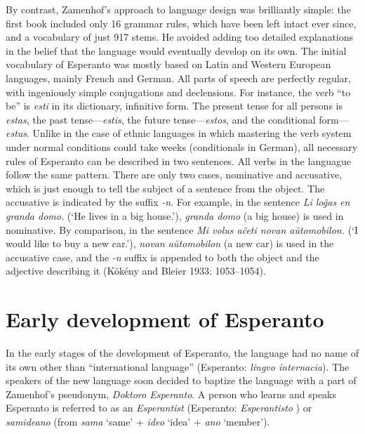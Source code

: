 By contrast, Zamenhof's approach to language design was brilliantly simple: the first book included only 16 grammar rules, which have been left intact ever since, and a vocabulary of just 917 stems.
He avoided adding too detailed explanations in the belief that the language would eventually develop on its own.
The initial vocabulary of Esperanto was mostly based on Latin and Western European languages, mainly French and German.
All parts of speech are perfectly regular, with ingeniously simple conjugations and declensions.
For instance, the verb ``to be'' is \textit{esti} in its dictionary, infinitive form.
The present tense for all persons is \textit{estas}, the past tense---\textit{estis}, the future tense---\textit{estos}, and the conditional form---\textit{estus}.
Unlike in the case of ethnic languages in which mastering the verb system under normal conditions could take weeks (conditionals in German), all necessary rules of Esperanto can be described in two sentences.
All verbs in the languague follow the same pattern.
There are only two cases, nominative and accusative, which is just enough to tell the subject of a sentence from the object.
The accusative is indicated by the suffix \textit{-n}.
For example, in the sentence \textit{Li loĝas en granda domo.} (`He lives in a big house.'), \textit{granda domo} (a big house) is used in nominative.
By comparison, in the sentence \textit{Mi volus aĉeti novan aŭtomobilon.} (`I would like to buy a new car.'), \textit{novan aŭtomobilon} (a new car) is used in the accusative case, and the \textit{-n} suffix is appended to both the object and the adjective describing it
(Kökény and Bleier 1933: 1053--1054).


\section{Early development of Esperanto}

In the early stages of the development of Esperanto, the language had no name of its own other than ``international language'' (Esperanto: \textit{lingvo internacia}).
The speakers of the new language soon decided to baptize the language with a part of Zamenhof's pseudonym, \textit{Doktoro Esperanto}.
A person who learns and speaks Esperanto is referred to as an \textit{Esperantist} (Esperanto: \textit{Esperantisto}%
) or \textit{samideano} (from \textit{sama} `same' + \textit{ideo} `idea' + \textit{ano} `member').

